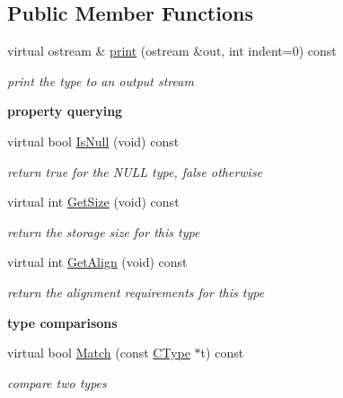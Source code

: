 \subsection*{Public Member Functions}
\begin{DoxyCompactItemize}
\item 
virtual ostream \& \hyperlink{classCNullType_a59d45ad03dae618e98617593efb267af}{print} (ostream \&out, int indent=0) const 
\begin{DoxyCompactList}\small\item\em print the type to an output stream \end{DoxyCompactList}\end{DoxyCompactItemize}
\begin{Indent}{\bf property querying}\par
\begin{DoxyCompactItemize}
\item 
\hypertarget{classCNullType_acc9b397945744372d5432c5473683b59}{virtual bool \hyperlink{classCNullType_acc9b397945744372d5432c5473683b59}{Is\-Null} (void) const }\label{classCNullType_acc9b397945744372d5432c5473683b59}

\begin{DoxyCompactList}\small\item\em return {\itshape true} for the N\-U\-L\-L type, {\itshape false} otherwise \end{DoxyCompactList}\item 
virtual int \hyperlink{classCNullType_ac64fdad5467b62ecd200971a71c059ce}{Get\-Size} (void) const 
\begin{DoxyCompactList}\small\item\em return the storage size for this type \end{DoxyCompactList}\item 
virtual int \hyperlink{classCNullType_a0fbbd6b46301c7722348191436c04f75}{Get\-Align} (void) const 
\begin{DoxyCompactList}\small\item\em return the alignment requirements for this type \end{DoxyCompactList}\end{DoxyCompactItemize}
\end{Indent}
\begin{Indent}{\bf type comparisons}\par
\begin{DoxyCompactItemize}
\item 
virtual bool \hyperlink{classCNullType_a052e0e6d1133b377c882eefff9cba0ca}{Match} (const \hyperlink{classCType}{C\-Type} $\ast$t) const 
\begin{DoxyCompactList}\small\item\em compare two types \end{DoxyCompactList}\end{DoxyCompactItemize}
\end{Indent}
